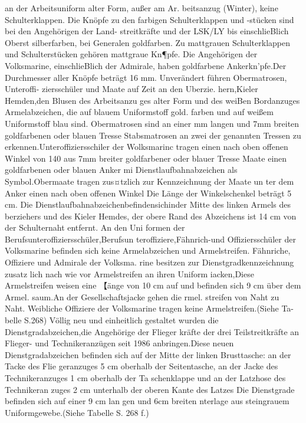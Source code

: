 an der Arbeitsuniform alter Form, außer am Ar.
beitsanzug (Winter), keine Schulterklappen.
Die Knöpfe zu den farbigen Schulterklappen
und -stücken sind bei den Angehörigen der Land-
streitkräfte und der LSK/LY bis einschlieBlich
Oberst silberfarben, bei Generalen goldfarben. Zu
mattgrauen Schulterklappen und Schulterstücken
gehören mattgraue Kn¶pfe. Die Angehörigen der
Volksmarine, einschlieBlich der Admirale, haben goldfarbene Ankerkn'pfe.Der Durchmesser aller
Knöpfe beträgt 16 mm.
Unverändert führen Obermatrosen, Unteroffi-
ziersschüler und Maate auf Zeit an den Uberzie.
hern,Kieler Hemden,den Blusen des Arbeitsanzu
ges alter Form und des weiBen Bordanzuges
Armelabzeichen, die auf blauem Uniformstoff gold.
farben und auf weißem Uniformstoff blau sind.
Obermatrosen sind an einer mm langen und
7mm breiten goldfarbenen oder blauen Tresse
Stabsmatrosen an zwei der genannten Tressen zu
erkennen.Unteroffiziersschiler der Wolksmarinc
tragen einen nach oben offenen Winkel von 140
aus 7mm breiter goldfarbener oder blauer Tresse
Maate einen goldfarbenen oder blauen Anker mi
Dienstlaufbahnabzeichen als Symbol.Obermaate
tragen zus¤tzlich zur Kennzeichnung der Maate un
ter dem Anker einen nach oben offenen Winkel
Die Länge der Winkelschenkel beträgt 5 cm. Die
Dienstlaufbahnabzeichenbefindensichinder
Mitte des linken Armels des berziehers und des
Kieler Hemdes, der obere Rand des Abzeichens ist
14 cm von der Schulternaht entfernt. An den Uni
formen der Berufsunteroffiziersschüler,Berufsun
teroffiziere,Fähnrich-und Offiziersschüler der
Volksmarine befinden sich keine Armelabzeichen
und Armelstreifen.
Fähnriche, Offiziere und Admirale der Volksma.
rine besitzen zur Dienstgradkennzeichnung zusatz
lich nach wie vor Armelstreifen an ihren Uniform
iacken,Diese Armelstreifen weisen eine 【änge von
10 cm auf und befinden sich 9 cm über dem Armel.
saum.An der Gesellschaftsjacke gehen die rmel.
streifen von Naht zu Naht. Weibliche Offiziere der
Volksmarine tragen keine Armelstreifen.(Siehe Ta-
belle S.268)
Völlig neu und einheitlich gestaltet wurden die
Dienstgradabzeichen,die Angehörige der Flieger
kräfte der drei Teilstreitkräfte an Flieger- und
Technikeranzügen seit 1986 anbringen.Diese
neuen Dienstgradabzeichen befinden sich auf der
Mitte der linken Brusttasche: an der Tacke des Flie
geranzuges 5 cm oberhalb der Seitentasche, an der Jacke des Technikeranzuges 1 cm oberhalb der Ta
schenklappe und an der Latzhose des Technikeran
zuges 2 cm unterhalb der oberen Kante des Latzes
Die Dienstgrade befinden sich auf einer 9 cm lan
gen und 6cm breiten nterlage aus steingrauem
Uniformgewebe.(Siehe Tabelle S. 268 f.)
